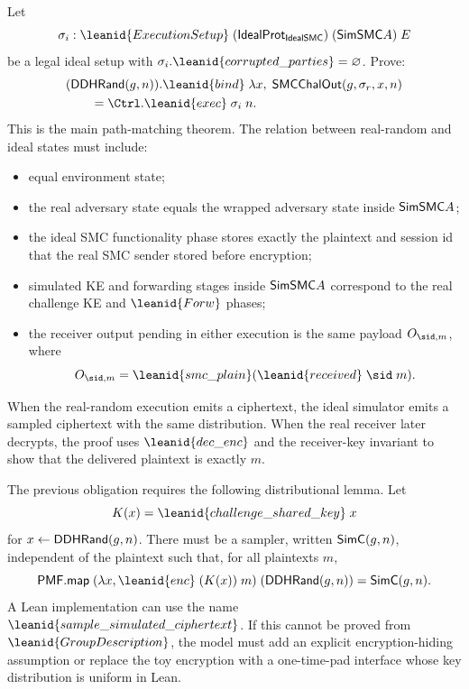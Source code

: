 \begin{obligation}
Let
\[
  \sigma_i :
    \leanid{ExecutionSetup}\;
      (\IdealProt_{\IdealSMC})\;(\SimSMC A)\;E
\]
be a legal ideal setup with
\(\sigma_i.\leanid{corrupted\_parties}=\varnothing\).
Prove:
\[
\begin{aligned}
&(\DDHRand(g,n)).\leanid{bind}\;
  \lambda x,\;
    \SMCChalOut(g,\sigma_r,x,n)\\
&\qquad =
  \Ctrl.\leanid{exec}\;\sigma_i\;n .
\end{aligned}
\]
This is the main path-matching theorem.  The relation between real-random and
ideal states must include:
\begin{itemize}
\item equal environment state;
\item the real adversary state equals the wrapped adversary state inside
\(\mathsf{SimSMC} A\);
\item the ideal SMC functionality phase stores exactly the plaintext and
session id that the real SMC sender stored before encryption;
\item simulated KE and forwarding stages inside \(\mathsf{SimSMC} A\) correspond to
the real challenge KE and \(\leanid{Forw}\) phases;
\item the receiver output pending in either execution is the same payload
  \(O_{\sid,m}\), where
\[
  O_{\sid,m}=
    \leanid{smc\_plain}(\leanid{received}\;\sid\;m).
\]
\end{itemize}
When the real-random execution emits a ciphertext, the ideal simulator emits a
sampled ciphertext with the same distribution.  When the real receiver later
decrypts, the proof uses \(\leanid{dec\_enc}\) and the receiver-key invariant to
show that the delivered plaintext is exactly \(m\).
\end{obligation}

\begin{obligation}
The previous obligation requires the following distributional lemma.  Let
\[
  K(x)=\leanid{challenge\_shared\_key}\;x
\]
for \(x\leftarrow \mathsf{DDHRand}(g,n)\).  There must be a sampler, written
\(\mathsf{SimC}(g,n)\), independent of the plaintext such that, for all plaintexts
\(m\),
\[
  \mathsf{PMF.map}\;(\lambda x,\leanid{enc}\;(K(x))\;m)\;(\DDHRand(g,n))
  =
  \SimC(g,n).
\]
A Lean implementation can use the name
\(\leanid{sample\_simulated\_ciphertext}\).
If this cannot be proved from \(\leanid{GroupDescription}\), the model must add
an explicit encryption-hiding assumption or replace the toy encryption with a
one-time-pad interface whose key distribution is uniform in Lean.
\end{obligation}

